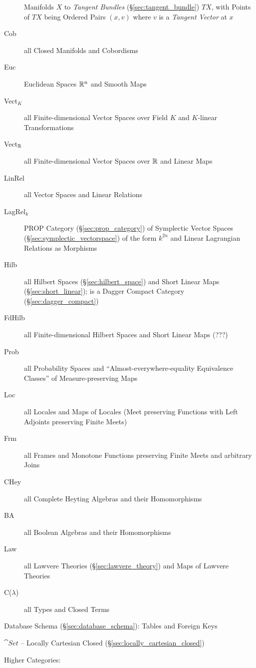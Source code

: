 \begin{description}
  Manifolds $X$ to \emph{Tangent Bundles} (\S\ref{sec:tangent_bundle}) $T X$,
  with Points of $T X$ being Ordered Pairs $(x, v)$ where $v$ is a \emph{Tangent
    Vector} at $x$
\item [Cob] all Closed Manifolds and Cobordisms
\item [Euc] Euclidean Spaces $\mathbb{R}^n$ and Smooth Maps
\item [Vect$_K$] all Finite-dimensional Vector Spaces over Field $K$
  and $K$-linear Transformations
\item [Vect$_{\mathbb{R}}$] all Finite-dimensional Vector Spaces over
  $\mathbb{R}$ and Linear Maps
\item [LinRel] all Vector Spaces and Linear Relations %
\item [LagRel$_k$] PROP Category (\S\ref{sec:prop_category}) of Symplectic
  Vector Spaces (\S\ref{sec:symplectic_vectorspace}) of the form $k^{2n}$ and
  Linear Lagrangian Relations as Morphisms
\item [Hilb] all Hilbert Spaces (\S\ref{sec:hilbert_space}) and Short
  Linear Maps (\S\ref{sec:short_linear}); is a Dagger Compact Category
  (\S\ref{sec:dagger_compact})
\item [FdHilb] all Finite-dimensional Hilbert Spaces and Short Linear
  Maps (???)
\item [Prob] all Probability Spaces and ``Almost-everywhere-equality Equivalence
  Classes'' of Measure-preserving Maps
\item [Loc] all Locales and Maps of Locales (Meet preserving Functions
  with Left Adjoints preserving Finite Meets)
\item [Frm] all Frames and Monotone Functions preserving Finite Meets
  and arbitrary Joins
\item [CHey] all Complete Heyting Algebras and their Homomorphisms
\item [BA] all Boolean Algebras and their Homomorphisms
\item [Law] all Lawvere Theories (\S\ref{sec:lawvere_theory}) and Maps
  of Lawvere Theories
\item [C($\lambda$)] all Types and Closed Terms
\end{description}

Database Schema (\S\ref{sec:database_schema}): Tables and Foreign Keys

$\cat{Set}$ -- Locally Cartesian Closed
(\S\ref{sec:locally_cartesian_closed})

Higher Categories:


